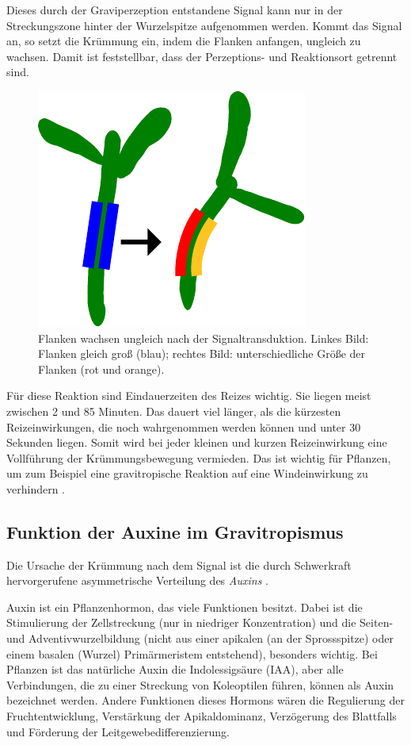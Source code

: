 \documentclass[
11pt, 
ngerman,
listof=totocnumbered,
oneside,
bibliography=totocnumbered,
abstracton
]{scrreprt}
\begin{document}
Dieses durch der Graviperzeption entstandene Signal kann nur in der Streckungszone hinter der Wurzelspitze aufgenommen werden. Kommt das Signal an, so setzt die Krümmung ein, indem die Flanken anfangen, ungleich zu wachsen. Damit ist feststellbar, dass der Perzeptions- und Reaktionsort getrennt sind.

\begin{figure}[H]
	\centering 
	\includegraphics[width = 0.4\linewidth]{images/newdiff.pdf}
	\caption{Flanken wachsen ungleich nach der Signaltransduktion. Linkes Bild: Flanken gleich groß (blau); rechtes Bild: unterschiedliche Größe der Flanken (rot und orange).}
\end{figure} 


Für diese Reaktion sind Eindauerzeiten des Reizes wichtig. Sie liegen meist zwischen 2 und 85 Minuten. Das dauert viel länger, als die kürzesten Reizeinwirkungen, die noch wahrgenommen werden können und unter 30 Sekunden liegen. 
Somit wird bei jeder kleinen und kurzen Reizeinwirkung eine Vollführung der Krümmungsbewegung vermieden. Das ist wichtig für Pflanzen, um zum Beispiel eine gravitropische Reaktion auf eine Windeinwirkung zu verhindern \parencite[531]{Luettge}.


\subsection{Funktion der Auxine im Gravitropismus}

Die Ursache der Krümmung nach dem Signal ist die durch Schwerkraft hervorgerufene asymmetrische Verteilung des \emph{Auxins}  \parencite[502--503]{Nultsch}.

Auxin ist ein Pflanzenhormon, das viele Funktionen besitzt. Dabei ist die Stimulierung der Zellstreckung (nur in niedriger Konzentration) und die Seiten- und Adventivwurzelbildung (nicht aus einer apikalen (an der Sprossspitze) oder einem basalen (Wurzel) Primärmeristem entstehend), besonders wichtig. 
Bei Pflanzen ist das natürliche Auxin die Indolessigsäure (IAA), aber alle Verbindungen, die zu einer Streckung von Koleoptilen führen, können als Auxin bezeichnet werden.
Andere Funktionen dieses Hormons wären die Regulierung der Fruchtentwicklung, Verstärkung der Apikaldominanz, Verzögerung des Blattfalls und Förderung der Leitgewebedifferenzierung.
\end{document}
